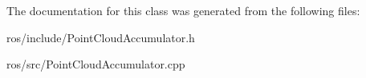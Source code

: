 \-The documentation for this class was generated from the following files\-:\begin{DoxyCompactItemize}
\item 
ros/include/\-Point\-Cloud\-Accumulator.\-h\item 
ros/src/\-Point\-Cloud\-Accumulator.\-cpp\end{DoxyCompactItemize}
